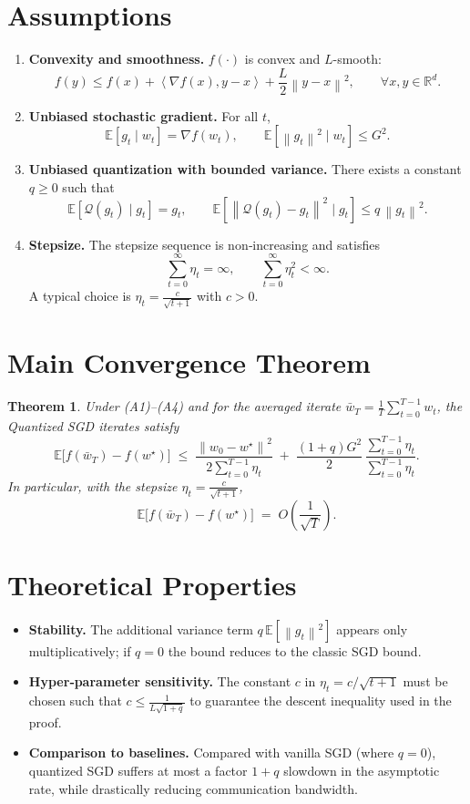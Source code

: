 \documentclass{article}
\newtheorem{theorem}{Theorem}
\newcommand{\E}{\mathbb{E}}
\newcommand{\R}{\mathbb{R}}
\newcommand{\norm}[1]{\left\| #1 \right\|}
\newcommand{\ip}[2]{\left\langle #1,#2 \right\rangle}
\newcommand{\Q}{\mathcal{Q}}
\begin{document}
\newpage

\section*{Assumptions}
\begin{enumerate}[label=(A\arabic*)]
\item \textbf{Convexity and smoothness.} $f(\cdot)$ is convex and $L$-smooth:
\[
f(y)\le f(x)+\ip{\nabla f(x)}{y-x}+\frac{L}{2}\norm{y-x}^2,\qquad\forall x,y\in\R^d.
\]
\item \textbf{Unbiased stochastic gradient.} For all $t$,
\[
\E[g_t\mid w_t]=\nabla f(w_t),\qquad \E[\norm{g_t}^2\mid w_t]\le G^2.
\]
\item \textbf{Unbiased quantization with bounded variance.} There exists a constant $q\ge 0$ such that
\[
\E[\Q(g_t)\mid g_t]=g_t,\qquad 
\E\!\left[\norm{\Q(g_t)-g_t}^2\mid g_t\right]\le q\,\norm{g_t}^2 .
\]
\item \textbf{Stepsize.} The stepsize sequence is non‑increasing and satisfies
\[
\sum_{t=0}^{\infty}\eta_t=\infty,\qquad
\sum_{t=0}^{\infty}\eta_t^{2}<\infty .
\]
A typical choice is $\eta_t=\frac{c}{\sqrt{t+1}}$ with $c>0$.
\end{enumerate}

\section*{Main Convergence Theorem}
\begin{theorem}\label{thm:conv}
Under (A1)–(A4) and for the averaged iterate $\bar w_T=\frac1T\sum_{t=0}^{T-1}w_t$, the Quantized SGD iterates satisfy
\[
\E\!\bigl[f(\bar w_T)-f(w^\star)\bigr]\;\le\;
\frac{\norm{w_0-w^\star}^2}{2\sum_{t=0}^{T-1}\eta_t}
\;+\;
\frac{(1+q)G^{2}}{2}\,\frac{\sum_{t=0}^{T-1}\eta_t}{\sum_{t=0}^{T-1}\eta_t}.
\]
In particular, with the stepsize $\eta_t=\frac{c}{\sqrt{t+1}}$,
\[
\E\!\bigl[f(\bar w_T)-f(w^\star)\bigr]\;=\;O\!\left(\frac{1}{\sqrt{T}}\right).
\]
\end{theorem}

\section*{Theoretical Properties}
\begin{itemize}
\item \textbf{Stability.} The additional variance term $q\,\E[\norm{g_t}^2]$ appears only multiplicatively; if $q=0$ the bound reduces to the classic SGD bound.
\item \textbf{Hyper‑parameter sensitivity.} The constant $c$ in $\eta_t=c/\sqrt{t+1}$ must be chosen such that $c\le \frac{1}{L\sqrt{1+q}}$ to guarantee the descent inequality used in the proof.
\item \textbf{Comparison to baselines.} Compared with vanilla SGD (where $q=0$), quantized SGD suffers at most a factor $1+q$ slowdown in the asymptotic rate, while drastically reducing communication bandwidth.
\end{itemize}
\end{document}
